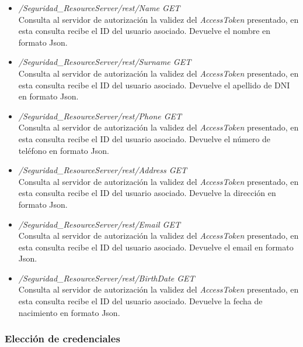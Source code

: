 \documentclass[a4,12pt,onecolum]{article}
\begin{document}
\begin{itemize}
\begin{itemize}
		\item \emph{/Seguridad\_ResourceServer/rest/Name	GET} \\
		Consulta al servidor de autorización la validez del \emph{AccessToken} presentado, en esta consulta 			recibe el ID del usuario asociado. Devuelve el nombre en formato Json.

		\item \emph{/Seguridad\_ResourceServer/rest/Surname	GET} \\
		Consulta al servidor de autorización la validez del \emph{AccessToken} presentado, en esta consulta 			recibe el ID del usuario asociado. Devuelve el apellido de DNI en formato Json.

		\item \emph{/Seguridad\_ResourceServer/rest/Phone	GET} \\
		Consulta al servidor de autorización la validez del \emph{AccessToken} presentado, en esta consulta 			recibe el ID del usuario asociado. Devuelve el número de teléfono en formato Json.

		\item \emph{/Seguridad\_ResourceServer/rest/Address	GET} \\
		Consulta al servidor de autorización la validez del \emph{AccessToken} presentado, en esta consulta 			recibe el ID del usuario asociado. Devuelve la dirección en formato Json.

		\item \emph{/Seguridad\_ResourceServer/rest/Email	GET} \\
		Consulta al servidor de autorización la validez del \emph{AccessToken} presentado, en esta consulta 			recibe el ID del usuario asociado. Devuelve el email en formato Json.

		\item \emph{/Seguridad\_ResourceServer/rest/BirthDate	GET} \\
		Consulta al servidor de autorización la validez del \emph{AccessToken} presentado, en esta consulta 			recibe el ID del usuario asociado. Devuelve la fecha de nacimiento en formato Json.
	\end{itemize}
\end{itemize}



\subsubsection{Elección de credenciales}
\end{document}

